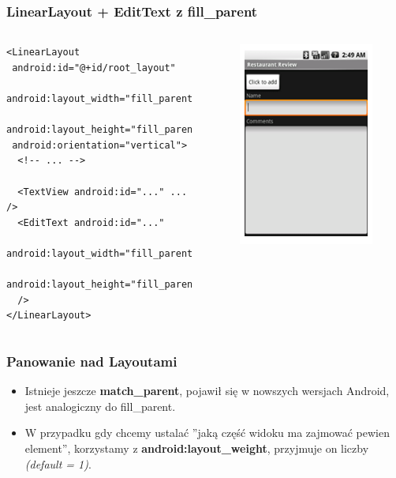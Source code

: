\begin{frame}[fragile]\frametitle{LinearLayout + EditText z fill\_parent}
 \begin{columns}
  \begin{verbatim}
<LinearLayout
 android:id="@+id/root_layout"
 android:layout_width="fill_parent"
 android:layout_height="fill_parent"
 android:orientation="vertical">
  <!-- ... -->

  <TextView android:id="..." ... />
  <EditText android:id="..."
   android:layout_width="fill_parent"
   android:layout_height="fill_parent" 
  />
</LinearLayout>

  \end{verbatim}
  \begin{figure}
   \includegraphics[width=.7\textwidth]{images/linearlayout_fill}   
  \end{figure}

 \end{columns}
\end{frame}

\begin{frame}[fragile]\frametitle{Panowanie nad Layoutami}
\begin{itemize}
 \item Istnieje jeszcze \textbf{match\_parent}, pojawił się w nowszych wersjach Android, jest analogiczny do fill\_parent.
 \item W przypadku gdy chcemy ustalać ''jaką część widoku ma zajmować pewien element'', korzystamy z \textbf{android:layout\_weight}, przyjmuje on liczby \textit{(default = 1)}.
\end{itemize}
\end{frame}

